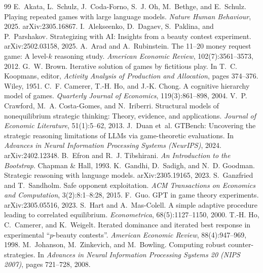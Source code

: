 \documentclass[11pt]{article}
\begin{document}
\begingroup\small

\begin{thebibliography}{99}
 E.~Akata, L.~Schulz, J.~Coda-Forno, S.~J. Oh, M.~Bethge, and E.~Schulz. Playing repeated games with large language models. \emph{Nature Human Behaviour}, 2025. arXiv:2305.16867.
 I.~Alekseenko, D.~Dagaev, S.~Paklina, and P.~Parshakov. Strategizing with AI: Insights from a beauty contest experiment. arXiv:2502.03158, 2025.
 A.~Arad and A.~Rubinstein. The 11--20 money request game: A level-$k$ reasoning study. \emph{American Economic Review}, 102(7):3561--3573, 2012.
 G.~W. Brown. Iterative solution of games by fictitious play. In T.~C. Koopmans, editor, \emph{Activity Analysis of Production and Allocation}, pages 374--376. Wiley, 1951.
 C.~F. Camerer, T.-H. Ho, and J.-K. Chong. A cognitive hierarchy model of games. \emph{Quarterly Journal of Economics}, 119(3):861--898, 2004.
 V.~P. Crawford, M.~A. Costa-Gomes, and N.~Iriberri. Structural models of nonequilibrium strategic thinking: Theory, evidence, and applications. \emph{Journal of Economic Literature}, 51(1):5--62, 2013.
 J.~Duan et~al. GTBench: Uncovering the strategic reasoning limitations of LLMs via game-theoretic evaluations. In \emph{Advances in Neural Information Processing Systems (NeurIPS)}, 2024. arXiv:2402.12348.
 B.~Efron and R.~J. Tibshirani. \emph{An Introduction to the Bootstrap}. Chapman \& Hall, 1993.
 K.~Gandhi, D.~Sadigh, and N.~D. Goodman. Strategic reasoning with language models. arXiv:2305.19165, 2023.
 S.~Ganzfried and T.~Sandholm. Safe opponent exploitation. \emph{ACM Transactions on Economics and Computation}, 3(2):8:1--8:28, 2015.
 F.~Guo. GPT in game theory experiments. arXiv:2305.05516, 2023.
 S.~Hart and A.~Mas-Colell. A simple adaptive procedure leading to correlated equilibrium. \emph{Econometrica}, 68(5):1127--1150, 2000.
 T.-H. Ho, C.~Camerer, and K.~Weigelt. Iterated dominance and iterated best response in experimental ``$p$-beauty contests''. \emph{American Economic Review}, 88(4):947--969, 1998.
 M.~Johanson, M.~Zinkevich, and M.~Bowling. Computing robust counter-strategies. In \emph{Advances in Neural Information Processing Systems 20 (NIPS 2007)}, pages 721--728, 2008.

\end{thebibliography}
\end{document}
